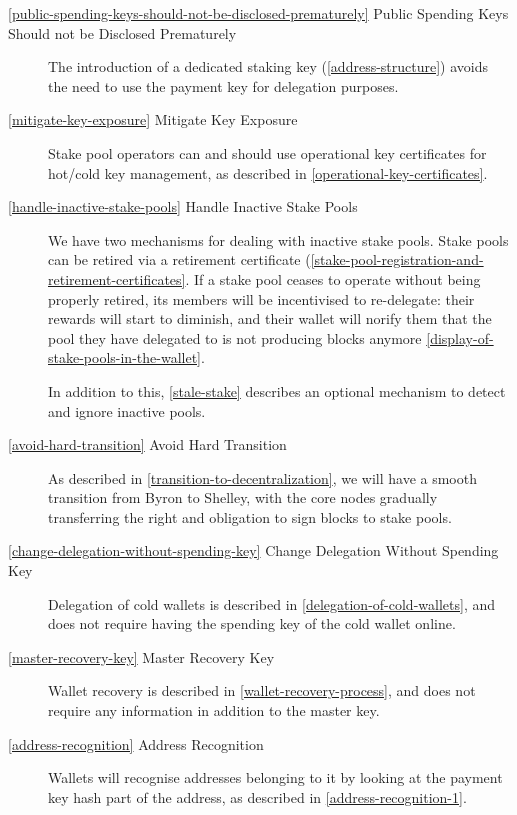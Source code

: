 \documentclass[11pt,a4paper]{article}
\begin{document}
\begin{description}
\item[\cref{public-spending-keys-should-not-be-disclosed-prematurely}
  Public Spending Keys Should not be Disclosed Prematurely] The
  introduction of a dedicated staking key (\cref{address-structure})
  avoids the need to use the payment key for delegation purposes.

\item[\cref{mitigate-key-exposure} Mitigate Key Exposure] Stake pool
  operators can and should use operational key certificates for hot/cold
  key management, as described in
  \cref{operational-key-certificates}.

\item[\cref{handle-inactive-stake-pools} Handle Inactive Stake Pools]
  We have two mechanisms for dealing with inactive stake pools. Stake
  pools can be retired via a retirement certificate
  (\cref{stake-pool-registration-and-retirement-certificates}. If a
  stake pool ceases to operate without being properly retired, its members will
  be incentivised to re-delegate: their rewards will start to diminish, and
  their wallet will norify them that the pool they have delegated to is
  not producing blocks anymore \cref{display-of-stake-pools-in-the-wallet}.

  In addition to this, \cref{stale-stake} describes an optional mechanism to
  detect and ignore inactive pools.

\item[\cref{avoid-hard-transition} Avoid Hard Transition] As described
  in \cref{transition-to-decentralization}, we will have a smooth
  transition from Byron to Shelley, with the core nodes gradually
  transferring the right and obligation to sign blocks to stake pools.

\item[\cref{change-delegation-without-spending-key} Change Delegation
  Without Spending Key] Delegation of cold wallets is described in
  \cref{delegation-of-cold-wallets}, and does not require having the
  spending key of the cold wallet online.

\item[\cref{master-recovery-key} Master Recovery Key] Wallet recovery
  is described in \cref{wallet-recovery-process}, and does not require
  any information in addition to the master key.

\item[\cref{address-recognition} Address Recognition] Wallets will
  recognise addresses belonging to it by looking at the payment key
  hash part of the address, as described in
  \cref{address-recognition-1}.


\end{description}
\end{document}

